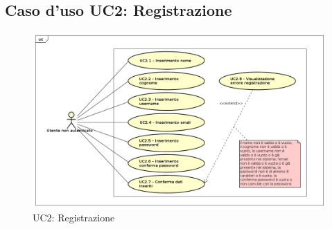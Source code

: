 \newpage
\subsection{Caso d'uso UC2: Registrazione}
\label{UC2}
\begin{figure}
	\includegraphics[scale=0.45]{UML/UC2.png}
	\caption{UC2: Registrazione}
\end{figure}
